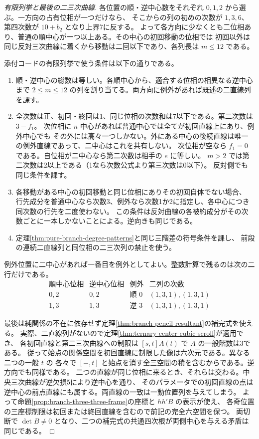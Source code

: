\begin{proof}[有限列挙と最後の二三次曲線]
各位置の順・逆中心数をそれぞれ $0,1,2$ から選ぶ。一方向の占有位相が一つだけなら、
そこからの列の初めの次数が $1,3,6$、第四次数が $10+b_2$ となり上界7に反する。
よって各方向に少なくとも二位相あり、普通の順中心が一つ以上ある。その中心の初回移動の位相では
初回以外は同じ反対三次曲線に着くから移動は二回以下であり、各列長は $m\le12$ である。

添付コードの有限列挙で使う条件は以下の通りである。
\begin{enumerate}
\item 順・逆中心の総数は等しい。各順中心から、適合する位相の相異なる逆中心まで
$2\le m\le12$ の列を割り当てる。両方向に例外があれば既述の二直線列を課す。
\item 全次数は正、初回・終回は1、同じ位相の次数和は7以下である。第二次数は $3-f_1$。
次位相に $n$ 中心があれば普通中心では全てが初回直線上にあり、例外中心でも
その外には高々一つしかない。外にある中心の後続直線は唯一の例外直線であって、二中心はこれを共有しない。
次位相が空なら $f_1=0$ である。自位相が二中心なら第二次数は相手の $e$ に等しい。
$m>2$ では第二次数は2以上である（1なら次数公式より第三次数は0以下）。
反対側でも同じ条件を課す。
\item 各移動がある中心の初回移動と同じ位相にありその初回自体でない場合、
行先成分を普通中心なら次数3、例外なら次数1か2に指定し、各中心につき同次数の行先を二度使わない。
この条件は反対曲線の各被約成分がその次数ごとに一本しかないことによる。逆向きも同じである。
\item 定理\ref{thm:pure-branch-degree-patterns}と同じ三階差の符号条件を課し、
前段の連続二直線列と同位相の二三次列の禁止を使う。
\end{enumerate}
例外位置に二中心があれば一番目を例外としてよい。整数計算で残るのは次の二行だけである。
\[
\begin{array}{c|c|c|c}
\text{順中心位相}&\text{逆中心位相}&\text{例外}&\text{二列の次数}\\\hline
0,2&0,2&\text{順 }0 &(1,3,1),(1,3,1)\\
1,3&1,3&\text{逆 }3 &(1,3,1),(1,3,1)
\end{array}
\]

最後は純関係の不在に依存せず定理\ref{thm:branch-pencil-resultant}の補完式を使える。
実際、二直線列がないので定理\ref{thm:ternary-center-cubic-scroll}が適用でき、
各初回直線と第二三次曲線への制限は $[s,t]A(t)$ で $A$ の一般階数は3である。
従って始点の関係空間を初回直線に制限した像は六次元である。異なる二つの一般 $t$ の
各々で $[-,t]$ と始点を消す全三空間の積を含むからである。逆方向でも同様である。
二つの直線が同じ位相に来るとき、それらは交わる。中央三次曲線が逆欠損5により逆中心を通り、
そのパラメータでの初回直線の点は逆中心の前点直線にも属する。両直線の一致は一動位置列を与えてしまう。
よって命題\ref{prop:branch-three-three-frame}の座標と $hh'B$ の表示が使え、
各奇位置の三座標制限は初回または終回直線を含むので前記の完全六空間を保つ。
両切断で $\det B\ne0$ となり、二つの補完式の共通四次根が両側中心を与える矛盾は同じである。
\end{proof}

